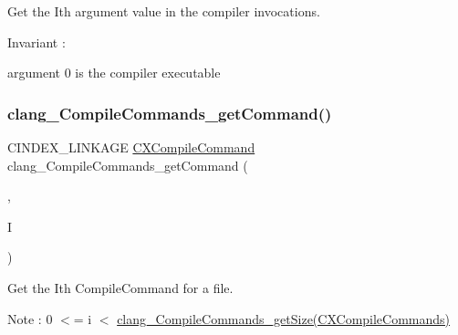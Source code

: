 Get the I\textquotesingle{}th argument value in the compiler invocations. 

Invariant \+:
\begin{DoxyItemize}
\item argument 0 is the compiler executable 
\end{DoxyItemize}\mbox{\label{group__COMPILATIONDB_gae623cfcbfc272851154922ede0ed2b8f}} 
\subsubsection{\texorpdfstring{clang\+\_\+\+Compile\+Commands\+\_\+get\+Command()}{clang\_CompileCommands\_getCommand()}}
{\footnotesize\ttfamily C\+I\+N\+D\+E\+X\+\_\+\+L\+I\+N\+K\+A\+GE \mbox{\hyperlink{group__COMPILATIONDB_gae59272595ab7fa4c1ed03348c56264bf}{C\+X\+Compile\+Command}} clang\+\_\+\+Compile\+Commands\+\_\+get\+Command (\begin{DoxyParamCaption}\item[{\mbox{\hyperlink{group__COMPILATIONDB_gab8bb09eb53b86dbd645dc3ed2b6b7248}{C\+X\+Compile\+Commands}}}]{,  }\item[{unsigned}]{I }\end{DoxyParamCaption})}



Get the I\textquotesingle{}th Compile\+Command for a file. 

Note \+: 0 $<$= i $<$ \mbox{\hyperlink{group__COMPILATIONDB_ga276329b9260a0b7d2ed25ccb8da88066}{clang\+\_\+\+Compile\+Commands\+\_\+get\+Size(\+C\+X\+Compile\+Commands)}} 